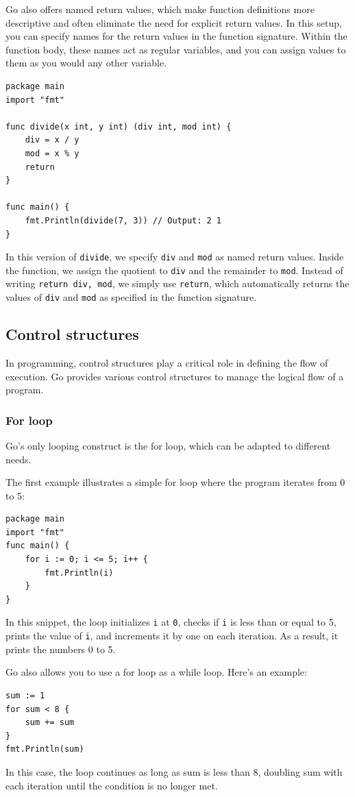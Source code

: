 Go also offers named return values, which make function definitions more descriptive and often eliminate the need for explicit return values. In this setup, you can specify names for the return values in the function signature. Within the function body, these names act as regular variables, and you can assign values to them as you would any other variable.

\begin{verbatim}
package main
import "fmt"

func divide(x int, y int) (div int, mod int) {
    div = x / y
    mod = x % y
    return
}

func main() {
    fmt.Println(divide(7, 3)) // Output: 2 1
}
\end{verbatim}
In this version of \texttt{divide}, we specify \texttt{div} and \texttt{mod} as named return values. Inside the function, we assign the quotient to \texttt{div} and the remainder to \texttt{mod}. Instead of writing \texttt{return div, mod}, we simply use \texttt{return}, which automatically returns the values of \texttt{div} and \texttt{mod} as specified in the function signature.

\subsection*{Control structures}
In programming, control structures play a critical role in defining the flow of execution. Go provides various control structures to manage the logical flow of a program. 

\subsubsection{For loop}
Go's only looping construct is the for loop, which can be adapted to different needs.

The first example illustrates a simple for loop where the program iterates from 0 to 5:

\begin{verbatim}
package main
import "fmt"
func main() {
    for i := 0; i <= 5; i++ {
        fmt.Println(i)
    }
}
\end{verbatim}
In this snippet, the loop initializes \texttt{i} at \texttt{0}, checks if \texttt{i} is less than or equal to 5, prints the value of \texttt{i}, and increments it by one on each iteration. As a result, it prints the numbers 0 to 5.

Go also allows you to use a for loop as a while loop. Here’s an example:
\begin{verbatim}
sum := 1
for sum < 8 {
    sum += sum
}
fmt.Println(sum)
\end{verbatim}
In this case, the loop continues as long as sum is less than 8, doubling sum with each iteration until the condition is no longer met.

